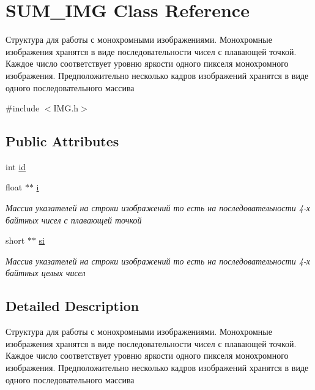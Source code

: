 \hypertarget{class_s_u_m___i_m_g}{\section{S\+U\+M\+\_\+\+I\+M\+G Class Reference}
\label{class_s_u_m___i_m_g}
}


Структура для работы с монохромными изображениями. Монохромные изображения хранятся в виде последовательности чисел с плавающей точкой. Каждое число соответствует уровню яркости одного пикселя монохромного изображения. Предположительно несколько кадров изображений хранятся в виде одного последовательного массива  




{\ttfamily \#include $<$I\+M\+G.\+h$>$}

\subsection*{Public Attributes}
\begin{DoxyCompactItemize}
\item 
int \hyperlink{class_s_u_m___i_m_g_a42cfef194bb1fe08e164e015ad3e6d69}{id}
\item 
float $\ast$$\ast$ \hyperlink{class_s_u_m___i_m_g_ac3c585d2cf35e0e9736a19daef633e02}{i}
\begin{DoxyCompactList}\small\item\em Массив указателей на строки изображений то есть на последовательности 4-\/х байтных чисел с плавающей точкой \end{DoxyCompactList}\item 
short $\ast$$\ast$ \hyperlink{class_s_u_m___i_m_g_a3da86ff936709e9963e6b0a87406afe1}{si}
\begin{DoxyCompactList}\small\item\em Массив указателей на строки изображений то есть на последовательности 4-\/х байтных целых чисел \end{DoxyCompactList}\end{DoxyCompactItemize}


\subsection{Detailed Description}
Структура для работы с монохромными изображениями. Монохромные изображения хранятся в виде последовательности чисел с плавающей точкой. Каждое число соответствует уровню яркости одного пикселя монохромного изображения. Предположительно несколько кадров изображений хранятся в виде одного последовательного массива 



